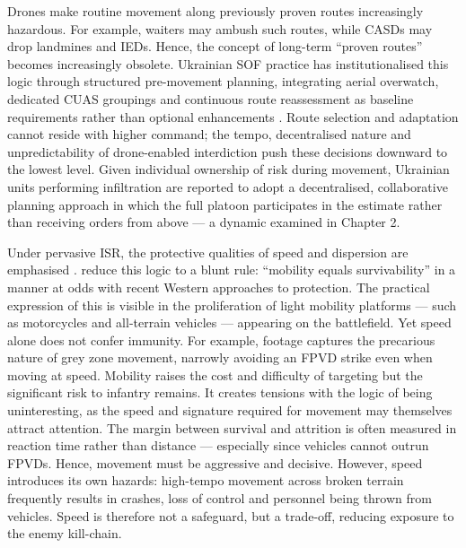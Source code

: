 {Drones make routine movement along previously proven routes increasingly hazardous. For example, waiters may ambush such routes, while CASDs may drop landmines and IEDs. Hence, the concept of long-term ``proven routes'' becomes increasingly obsolete. Ukrainian SOF practice has institutionalised this logic through structured pre-movement planning, integrating aerial overwatch, dedicated CUAS groupings and continuous route reassessment as baseline requirements rather than optional enhancements \parencite{uKR_LESSONS_LEARNED_1,uKR_LESSONS_LEARNED_2}. Route selection and adaptation cannot reside with higher command; the tempo, decentralised nature and unpredictability of drone-enabled interdiction push these decisions downward to the lowest level. Given individual ownership of risk during movement, Ukrainian units performing infiltration are reported to adopt a decentralised, collaborative planning approach in which the full platoon participates in the estimate rather than receiving orders from above \parencite[11:47--15:00]{Leach_curtain} --- a dynamic examined in Chapter 2.





Under pervasive ISR, the protective qualities of speed and dispersion are emphasised \parencite[62--63]{ZABRODSKYI_2022}. \textcite[65]{mingus_monility,neron_bancel_2024_05_27} reduce this logic to a blunt rule: ``mobility equals survivability'' in a manner at odds with recent Western approaches to protection. The practical expression of this is visible in the proliferation of light mobility platforms --- such as motorcycles and all-terrain vehicles --- appearing on the battlefield. Yet speed alone does not confer immunity. For example,  footage captures the precarious nature of grey zone movement, narrowly avoiding an FPVD strike even when moving at speed. Mobility raises the cost and difficulty of targeting but the significant risk to infantry remains. It creates tensions with the logic of being uninteresting, as the speed and signature required for movement may themselves attract attention. The margin between survival and attrition is often measured in reaction time rather than distance --- especially since vehicles cannot outrun FPVDs. Hence, movement must be aggressive and decisive. However, speed introduces its own hazards: high-tempo movement across broken terrain frequently results in crashes, loss of control and personnel being thrown from vehicles. Speed is therefore not a safeguard, but a trade-off, reducing exposure to the enemy kill-chain.


}
